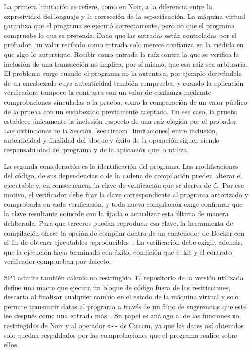 La primera limitación se refiere, como en Noir, a la diferencia entre la expresividad del lenguaje
y la corrección de la especificación. La máquina virtual garantiza que el programa se ejecutó
correctamente, pero no que el programa compruebe lo que se pretende. Dado que las entradas están
controladas por el probador, un valor recibido como entrada solo merece confianza en la medida en
que algo lo autentique. Recibir como entrada la raíz contra la que se verifica la inclusión de una
transacción no implica, por sí mismo, que esa raíz sea arbitraria. El problema surge cuando el
programa no la autentica, por ejemplo derivándola de un encabezado cuya autenticidad también
comprueba, y cuando la aplicación verificadora tampoco la contrasta con un valor de confianza
mediante comprobaciones vinculadas a la prueba, como la comparación de un valor público de la
prueba con un encabezado previamente aceptado. En ese caso, la prueba establece únicamente la
inclusión respecto de una raíz elegida por el probador. Las distinciones de
la Sección~\ref{sec:circom_limitaciones} entre inclusión, autenticidad y finalidad del bloque y
éxito de la operación siguen siendo responsabilidad del programa y de la aplicación que lo
utiliza.

La segunda consideración es la identificación del programa. Las modificaciones del código, de sus
dependencias o de la cadena de compilación pueden alterar el ejecutable y, en consecuencia, la
clave de verificación que se deriva de él. Por ese motivo, el verificador debe fijar la clave
correspondiente al programa autorizado y comprobarla en cada verificación, y toda nueva
compilación exige confirmar que la clave resultante coincide con la fijada o actualizar esta
última de manera deliberada. Para que terceros puedan reproducir esa clave, la herramienta de
compilación ofrece la opción de compilar dentro de un contenedor de Docker con el fin de obtener
ejecutables reproducibles~\cite{sp1repo}. La verificación debe exigir, además, que la ejecución haya
terminado con éxito, condición que el kit y el contrato verificador comprueban por defecto.

SP1 admite también cálculo no restringido. El repositorio de la versión utilizada define una macro
que ejecuta un bloque de código fuera de las restricciones, descarta al finalizar cualquier cambio
en el estado de la máquina virtual y solo permite transmitir datos al programa a través de un flujo
de sugerencias que este lee después como una entrada más~\cite{sp1repo}. Su papel es análogo al de
las funciones no restringidas de Noir y al operador \lstinline|<--| de Circom, ya que los datos así
obtenidos solo quedan respaldados por las comprobaciones que el programa realice sobre ellos.

